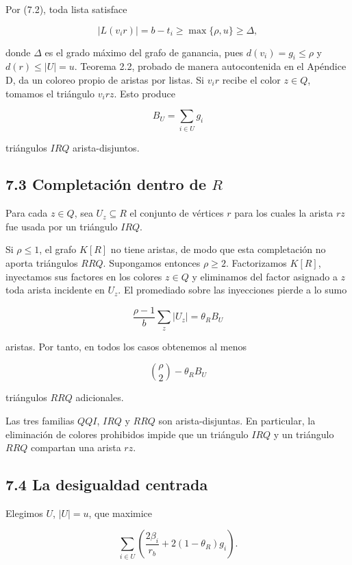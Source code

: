 \documentclass[
  spanish,
  11pt,
  a4paper,
]{article}
\begin{document}
Por (7.2), toda lista satisface

\[
|L(v_ir)|=b-t_i
\ge
\max\{\rho,u\}
\ge
\Delta,
\]

donde \(\Delta\) es el grado máximo del grafo de ganancia, pues \(d(v_i)=g_i\le\rho\) y \(d(r)\le|U|=u\). Teorema 2.2, probado de manera autocontenida en el Apéndice D, da un coloreo propio de aristas por listas. Si \(v_ir\) recibe el color \(z\in Q\), tomamos el triángulo \(v_irz\). Esto produce

\[
B_U=\sum_{i\in U}g_i
\]

triángulos \(IRQ\) arista-disjuntos.

\subsection{\texorpdfstring{7.3 Completación dentro de \(R\)}{7.3 Completación dentro de R}}\label{completaciuxf3n-dentro-de-r}

Para cada \(z\in Q\), sea \(U_z\subseteq R\) el conjunto de vértices \(r\) para los cuales la arista \(rz\) fue usada por un triángulo \(IRQ\).

Si \(\rho\le1\), el grafo \(K[R]\) no tiene aristas, de modo que esta completación no aporta triángulos \(RRQ\). Supongamos entonces \(\rho\ge2\). Factorizamos \(K[R]\), inyectamos sus factores en los colores \(z\in Q\) y eliminamos del factor asignado a \(z\) toda arista incidente en \(U_z\). El promediado sobre las inyecciones pierde a lo sumo

\[
\frac{\rho-1}{b}\sum_z|U_z|
=
\theta_RB_U
\]

aristas. Por tanto, en todos los casos obtenemos al menos

\[
\binom\rho2-\theta_RB_U
\]

triángulos \(RRQ\) adicionales.

Las tres familias \(QQI\), \(IRQ\) y \(RRQ\) son arista-disjuntas. En particular, la eliminación de colores prohibidos impide que un triángulo \(IRQ\) y un triángulo \(RRQ\) compartan una arista \(rz\).

\subsection{7.4 La desigualdad centrada}\label{la-desigualdad-centrada}

Elegimos \(U\), \(|U|=u\), que maximice

\[
\sum_{i\in U}
\left(
\frac{2\beta_i}{r_b}+2(1-\theta_R)g_i
\right).
\]
\end{document}
